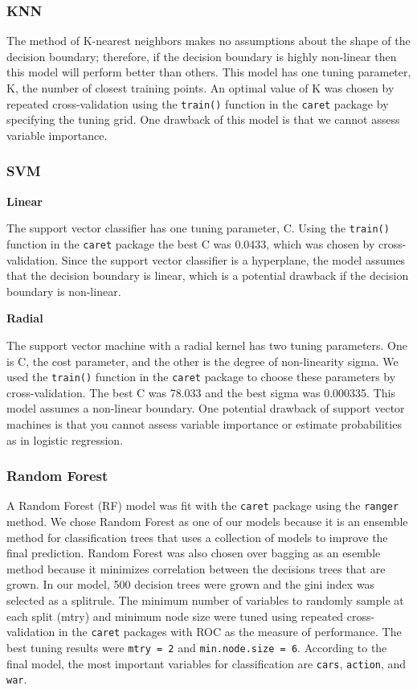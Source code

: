 \documentclass[]{article}
\begin{document}
\subsubsection{KNN}\label{knn}

The method of K-nearest neighbors makes no assumptions about the shape
of the decision boundary; therefore, if the decision boundary is highly
non-linear then this model will perform better than others. This model
has one tuning parameter, K, the number of closest training points. An
optimal value of K was chosen by repeated cross-validation using the
\texttt{train()} function in the \texttt{caret} package by specifying
the tuning grid. One drawback of this model is that we cannot assess
variable importance.

\subsubsection{SVM}\label{svm}

\textbf{Linear}

The support vector classifier has one tuning parameter, C. Using the
\texttt{train()} function in the \texttt{caret} package the best C was
0.0433, which was chosen by cross-validation. Since the support vector
classifier is a hyperplane, the model assumes that the decision boundary
is linear, which is a potential drawback if the decision boundary is
non-linear.

\textbf{Radial}

The support vector machine with a radial kernel has two tuning
parameters. One is C, the cost parameter, and the other is the degree of
non-linearity sigma. We used the \texttt{train()} function in the
\texttt{caret} package to choose these parameters by cross-validation.
The best C was 78.033 and the best sigma was 0.000335. This model
assumes a non-linear boundary. One potential drawback of support vector
machines is that you cannot assess variable importance or estimate
probabilities as in logistic regression.

\subsubsection{Random Forest}\label{random-forest}

A Random Forest (RF) model was fit with the \texttt{caret} package using
the \texttt{ranger} method. We chose Random Forest as one of our models
because it is an ensemble method for classification trees that uses a
collection of models to improve the final prediction. Random Forest was
also chosen over bagging as an esemble method because it minimizes
correlation between the decisions trees that are grown. In our model,
500 decision trees were grown and the gini index was selected as a
splitrule. The minimum number of variables to randomly sample at each
split (mtry) and minimum node size were tuned using repeated
cross-validation in the \texttt{caret} packages with ROC as the measure
of performance. The best tuning results were \texttt{mtry\ =\ 2} and
\texttt{min.node.size\ =\ 6}. According to the final model, the most
important variables for classification are \texttt{cars},
\texttt{action}, and \texttt{war}.
\end{document}
